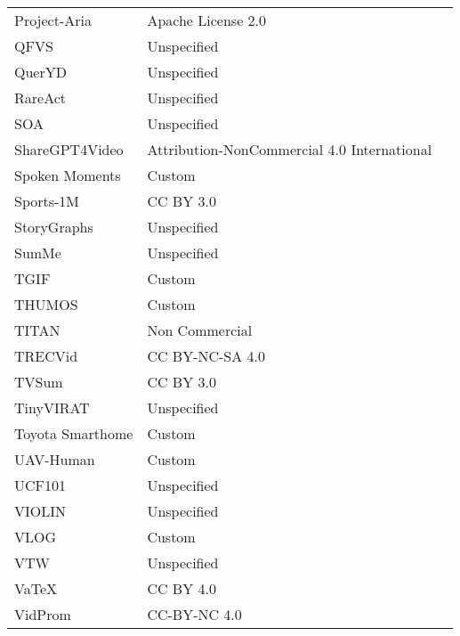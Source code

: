 \begin{longtable}{p{5cm}|p{5cm}|p{5cm}}
Project-Aria & Apache License 2.0 & \autocite{panAriaDigitalTwin2023,lvAriaEverydayActivities2024} \\
QFVS & Unspecified & \autocite{sharghiQueryFocusedVideoSummarization2017} \\
QuerYD & Unspecified & \autocite{oncescuQuerYDVideoDataset2021} \\
RareAct & Unspecified & \autocite{miechRareActVideoDataset2020} \\
SOA & Unspecified & \autocite{dibaLargeScaleHolistic2020} \\
ShareGPT4Video & Attribution-NonCommercial 4.0 International & \autocite{chenShareGPT4VideoImprovingVideo2024} \\
Spoken Moments & Custom & \autocite{monfortSpokenMomentsLearning2021} \\
Sports-1M & CC BY 3.0 & \autocite{karpathyLargeScaleVideoClassification2014} \\
StoryGraphs & Unspecified & \autocite{tapaswiStoryGraphsVisualizingCharacter2014} \\
SumMe & Unspecified & \autocite{gygliCreatingSummariesUser2014} \\
TGIF & Custom & \autocite{liTGIFNewDataset2016} \\
THUMOS & Custom & \autocite{idreesTHUMOSChallengeAction2017} \\
TITAN & Non Commercial & \autocite{mallaTITANFutureForecast2020} \\
TRECVid & CC BY-NC-SA 4.0 & \autocite{awadTRECVID2019Evaluation2020} \\
TVSum & CC BY 3.0 & \autocite{yalesongTVSumSummarizingWeb2015} \\
TinyVIRAT & Unspecified & \autocite{demirTinyVIRATLowresolutionVideo2020} \\
Toyota Smarthome & Custom & \autocite{dasToyotaSmarthomeRealWorld2019} \\
UAV-Human & Custom & \autocite{liUAVHumanLargeBenchmark2021} \\
UCF101 & Unspecified & \autocite{soomroUCF101Dataset1012012} \\
VIOLIN & Unspecified & \autocite{liuVIOLINLargeScaleDataset2020} \\
VLOG & Custom & \autocite{fouheyLifestyleVlogsEveryday2017} \\
VTW & Unspecified & \autocite{zengTitleGenerationUser2016} \\
VaTeX & CC BY 4.0 & \autocite{wangVATEXLargeScaleHighQuality2020} \\
VidProm & CC-BY-NC 4.0 & \autocite{wangVidProMMillionscaleReal2024} \\

\end{longtable}
